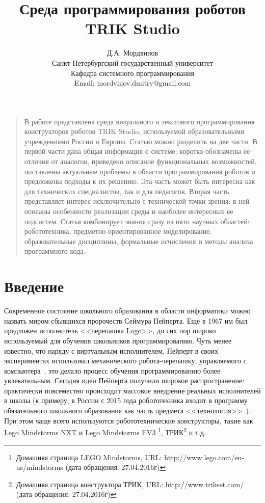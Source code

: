 \documentclass[a5paper]{article}
\title{Среда программирования роботов TRIK Studio}
\author{
	Д.А. Мордвинов \\
	Санкт-Петербургский государственный университет\\
	Кафедра системного программирования\\
	Email: mordvinov.dmitry@gmail.com
}
\date{}
\begin{document}
\maketitle
\thispagestyle{empty}

\begin{quote}
\small\noindent В работе представлена среда визуального и текстового программирования конструкторов роботов TRIK Studio, используемой образовательными учреждениями России и Европы. Статью можно разделить на две части. В первой части дана общая информация о системе: коротко обозначены ее отличия от аналогов, приведено описание функциональных возможностей, поставлены актуальные проблемы в области программирования роботов и предложены подходы к их решению. Эта часть может быть интересна как для технических специалистов, так и для педагогов. Вторая часть представляет интерес исключительно с технической точки зрения: в ней описаны особенности реализации среды и наиболее интересных ее подсистем. Статья комбинирует знания сразу из пяти научных областей: робототехника, предметно-ориентированное моделирование, образовательные дисциплины, формальные исчисления и методы анализа программного кода.
\end{quote}

\section*{Введение}
\label{chapter:introduction}

Современное состояние школьного образования в области информатики можно назвать миром сбывшихся пророчеств Сеймура Пейперта. Еще в 1967 им был предложен исполнитель <<черепашка Logo>>, до сих пор широко используемый для обучения школьников программированию. Чуть менее известно, что наряду с виртуальным исполнителем, Пейперт в своих экспериментах использовал механического робота-черепашку, управляемого с компьютера~\cite{papert1980mindstorms}, это делало процесс обучения программированию более увлекательным. Сегодня идеи Пейперта получили широкое распространение: практически повсеместно происходит массовое внедрение реальных исполнителей в школы (к примеру, в России с 2015 года робототехника входит в программу обязательного школьного образования как часть предмета <<технология>>~\cite{черёмухин2014внедрение,лучин2016внедрение}). При этом чаще всего используются робототехнические конструкторы, такие как Lego Mindstorms NXT и Lego Mindstorms EV3%
\footnote{Домашняя страница LEGO Mindstorms, URL: http://www.lego.com/en-us/mindstorms (дата обращения: 27.04.2016г)}, 
ТРИК\footnote{Домашняя страница конструктора ТРИК, URL: http://www.trikset.com/ (дата обращения: 27.04.2016г)} и т.д. 
\end{document}
